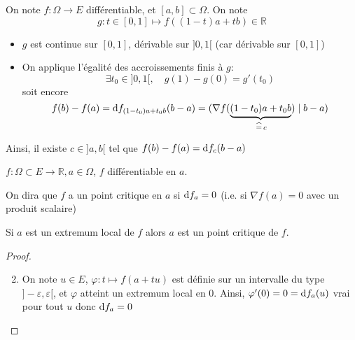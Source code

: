 \begin{rem}
    On note $f:\Omega\to E$ différentiable, et $[a, b]\subset \Omega$. On note \[ g:t\in[0, 1]\longmapsto f((1-t)a+tb)\in\mathbb R \]
    \begin{itemize}
        \item $g$ est continue sur $[0, 1]$, dérivable sur $]0, 1[$ (car dérivable sur $[0, 1]$)
        \item On applique l'égalité des accroissements finis à $g$: \[
                \exists t_0\in ]0, 1[, \quad g(1)-g(0)=g'(t_0)
            \]
            soit encore \[
                f(b)-f(a)=\mathrm{d} f_{(1-t_0)a+t_0b}(b-a)=(\nabla f(\underbrace{(1-t_0)a+t_0b}_{\,\widehat=\, c})\;|\;b-a)
            \]
    \end{itemize}
    Ainsi, il existe $c\in ]a, b[$ tel que $f(b)-f(a)=\mathrm{d} f_c(b-a)$
\end{rem}

\begin{thmdef}
    \Hyp $f:\Omega\subset E\to \mathbb R, a\in \Omega$, $f$ différentiable en $a$.
    \begin{concenum}
    \item On dira que $f$ a un point critique en $a$ si $\mathrm{d} f_a=0$ (i.e. si $\nabla f(a)=0$ avec un produit scalaire)
    \item Si $a$ est un extremum local de $f$ alors $a$ est un point critique de $f$.
    \end{concenum}
\end{thmdef}

\begin{proof}
    \begin{enumerate}
        \setcounter{enumi}{1}
    \item On note $u\in E$, $\varphi: t\longmapsto f(a+tu)$ est définie sur un intervalle du type $]-\varepsilon, \varepsilon[$, et $\varphi$ atteint un extremum local en $0$. Ainsi, $\varphi'(0)=0=\mathrm{d} f_a(u)$ vrai pour tout $u$ donc $\mathrm{d} f_a=0$
\end{enumerate}
\end{proof}

